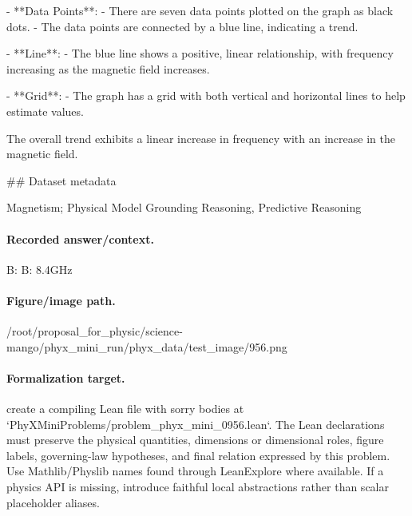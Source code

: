 - **Data Points**:
  - There are seven data points plotted on the graph as black dots.
  - The data points are connected by a blue line, indicating a trend.

- **Line**:
  - The blue line shows a positive, linear relationship, with frequency increasing as the magnetic field increases.

- **Grid**:
  - The graph has a grid with both vertical and horizontal lines to help estimate values.

The overall trend exhibits a linear increase in frequency with an increase in the magnetic field.

\#\# Dataset metadata

Magnetism; Physical Model Grounding Reasoning, Predictive Reasoning

\paragraph{Recorded answer/context.}
B: B: 8.4GHz

\paragraph{Figure/image path.}
/root/proposal\_for\_physic/science-mango/phyx\_mini\_run/phyx\_data/test\_image/956.png

\paragraph{Formalization target.}
create a compiling Lean file with sorry bodies at `PhyXMiniProblems/problem\_phyx\_mini\_0956.lean`. The Lean declarations must preserve the physical quantities, dimensions or dimensional roles, figure labels, governing-law hypotheses, and final relation expressed by this problem.
Use Mathlib/Physlib names found through LeanExplore where available. If a physics API is missing, introduce faithful local abstractions rather than scalar placeholder aliases.

